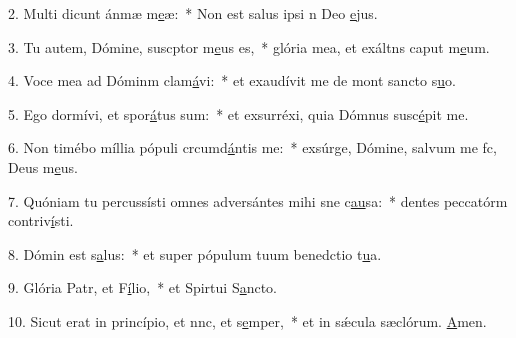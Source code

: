 2. Multi dicunt ánmæ m\uline{e}æ:~* Non est salus ipsi n Deo \uline{e}jus.\par 
3. Tu autem, Dómine, suscptor m\uline{e}us es,~* glória mea, et exáltns caput m\uline{e}um.\par 
4. Voce mea ad Dóminm clam\uline{á}vi:~* et exaudívit me de mont sancto s\uline{u}o.\par 
5. Ego dormívi, et spor\uline{á}tus sum:~* et exsurréxi, quia Dómnus susc\uline{é}pit me.\par 
6. Non timébo míllia pópuli crcumd\uline{á}ntis me:~* exsúrge, Dómine, salvum me fc, Deus m\uline{e}us.\par 
7. Quóniam tu percussísti omnes adversántes mihi sne c\uline{au}sa:~* dentes peccatórm contriv\uline{í}sti.\par 
8. Dómin est s\uline{a}lus:~* et super pópulum tuum benedctio t\uline{u}a.\par 
9. Glória Patr, et F\uline{í}lio,~* et Spirtui S\uline{a}ncto.\par 
10. Sicut erat in princípio, et nnc, et s\uline{e}mper,~* et in sǽcula sæclórum. \uline{A}men.\par 
